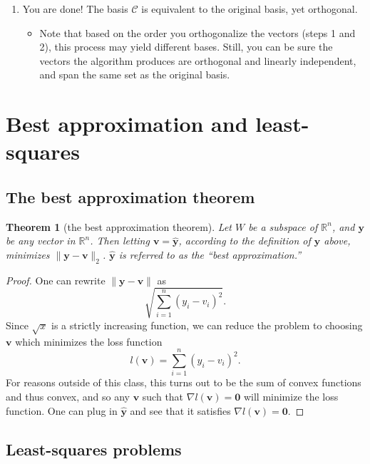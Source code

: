 \documentclass[draft,12pt]{report}
\newtheorem{theorem}{Theorem}
\renewcommand{\vec}[1]{\mathbf{#1}}
\begin{document}
\begin{enumerate}
\begin{itemize}
    \end{itemize}
    \item You are done! The basis $\mathcal{C}$ is equivalent to the original basis, yet orthogonal.
    \begin{itemize}
        \item Note that based on the order you orthogonalize the vectors (steps 1 and 2), this process may yield different bases. Still, you can be sure the vectors the algorithm produces are orthogonal and linearly independent, and span the same set as the original basis.
    \end{itemize}
\end{enumerate}

\section{Best approximation and least-squares}

\subsection{The best approximation theorem}

\begin{theorem}[the best approximation theorem]
    Let $W$ be a subspace of $\mathbb R^n$, and $\vec{y}$ be any vector in $\mathbb R^n$. Then letting $\vec{v} = \vec{\hat{y}}$, according to the definition of $\vec{\hat{y}}$ above, minimizes $\| \vec{y} - \vec{v} \|_2$. $\vec{\hat{y}}$ is referred to as the ``best approximation.''
\end{theorem}
\begin{proof}
    One can rewrite $\| \vec{y} - \vec{v} \|$ as
    \[ \sqrt{\sum_{i = 1}^n (y_i - v_i)^2}. \]
    Since $\sqrt{x}$ is a strictly increasing function, we can reduce the problem to choosing $\vec{v}$ which minimizes the loss function
    \[ l(\vec{v}) = \sum_{i = 1}^n (y_i - v_i)^2. \]
    For reasons outside of this class, this turns out to be the sum of convex functions and thus convex, and so any $\vec{v}$ such that $\nabla l(\vec{v}) = \vec{0}$ will minimize the loss function. One can plug in $\vec{\hat{y}}$ and see that it satisfies $\nabla l(\vec{v}) = \vec{0}$.
\end{proof}

\subsection{Least-squares problems}
\end{document}
